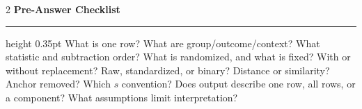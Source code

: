 \documentclass[8pt]{article}
\newcommand{\sect}[1]{\vspace{1pt}\textcolor{accent}{\textbf{\normalsize #1}}\par\vspace{1pt}\hrule height 0.35pt\vspace{0pt}}
\begin{document}
\begin{multicols*}{2}
\sect{Pre-Answer Checklist}
What is one row? What are group/outcome/context? What statistic and subtraction order? What is randomized, and what is fixed? With or without replacement? Raw, standardized, or binary? Distance or similarity? Anchor removed? Which $s$ convention? Does output describe one row, all rows, or a component? What assumptions limit interpretation?

\end{multicols*}
\end{document}
